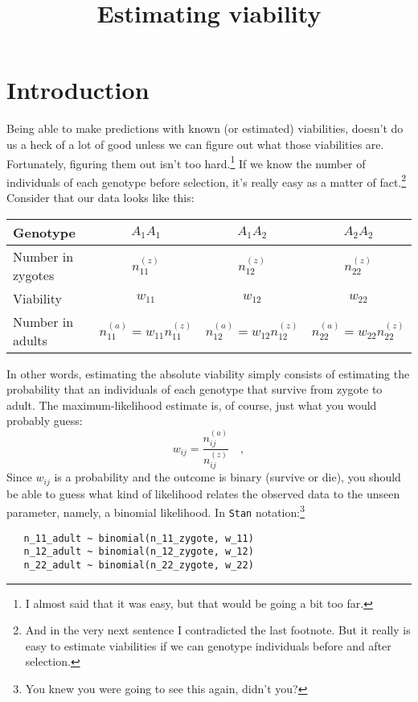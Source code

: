 \documentclass[12pt]{article}
\title{Estimating viability}
\begin{document}
\maketitle

\thispagestyle{first}

\section*{Introduction}

Being able to make predictions with known (or estimated) viabilities,
doesn't do us a heck of a lot of good unless we can figure out what
those viabilities are. Fortunately, figuring them out isn't too
hard.\footnote{I almost said that it was easy, but that would be going
  a bit too far.} If we know the number of individuals of each
genotype before selection, it's really easy as a matter of
fact.\footnote{And in the very next sentence I contradicted the last
  footnote. But it really is easy to estimate viabilities if we can
  genotype individuals before and after selection.} Consider that our
data looks like this:

\begin{center}
\begin{tabular}{l|ccc}
\hline\hline
Genotype & $A_1A_1$ & $A_1A_2$ & $A_2A_2$ \\
\hline
Number in zygotes & $n_{11}^{(z)}$ & $n_{12}^{(z)}$ & $n_{22}^{(z)}$ \\
Viability         & $w_{11}$ & $w_{12}$ & $w_{22}$ \\
Number in adults  & $n_{11}^{(a)} = w_{11}n_{11}^{(z)}$ & $n_{12}^{(a)} = w_{12}n_{12}^{(z)}$ & $n_{22}^{(a)} = w_{22}n_{22}^{(z)}$ \\
\hline
\end{tabular}
\end{center}

In other words, estimating the absolute viability simply consists of
estimating the probability that an individuals of each genotype that
survive from zygote to adult. The maximum-likelihood estimate is, of
course, just what you would probably guess:
\[
w_{ij} = \frac{n_{ij}^{(a)}}{n_{ij}^{(z)}} \quad ,
\]
Since $w_{ij}$ is a probability and the outcome is binary (survive or
die), you should be able to guess what kind of likelihood relates the
observed data to the unseen parameter, namely, a binomial
likelihood. In {\tt Stan} notation:\footnote{You knew you were going
  to see this again, didn't you?}
\begin{verbatim}
   n_11_adult ~ binomial(n_11_zygote, w_11)
   n_12_adult ~ binomial(n_12_zygote, w_12)
   n_22_adult ~ binomial(n_22_zygote, w_22)
\end{verbatim}
\end{document}
